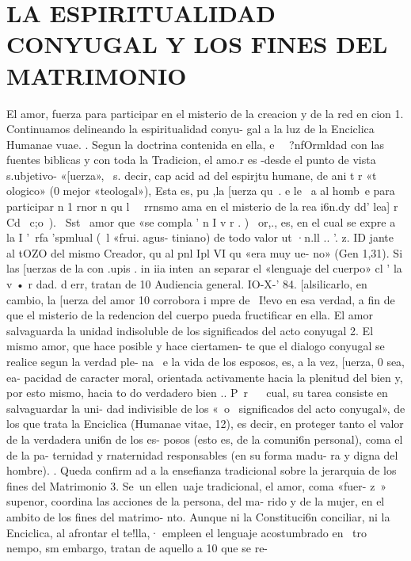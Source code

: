 \documentclass[letterpaper]{report}
\begin{document}
	{\centering
		\section{LA ESPIRITUALIDAD CONYUGAL Y LOS FINES DEL MATRIMONIO}
	}
	El amor, fuerza para participar en el misterio 
de la creacion y de la red en cion 
1. Continuamos delineando la espiritualidad conyu- 
	gal a la luz de la Enciclica Humanae vuae. 	. 
Segun la doctrina contenida en ella, e~ ~?nfOrmldad 
con las fuentes biblicas y con toda la Tradicion, el amo.r 
es -desde el punto de vista s.ubjetivo- «[uerza», ~s. decir, 
cap acid ad del espirjtu humane, de ani t r «t ologico» (0 
mejor «teologal»), Esta es, pu ,la [uerza qu~. e le ~a al 
homb~e para participar n 1 rnor n qu l~~ rrnsmo 
ama en el misterio de la rea i6n.dy dd' lea] r Cd ~c;o~). ~Sst~ 
	amor que «se compla ' n I v r 	. )~ 	or,., 
es, en el cual se expre a la I '~rfa 'spmlual (~l «frui. agus- 
tiniano) de todo valor ut ·n.ll .. '. z. ID jante al tOZO 
del mismo Creador, qu al pnl Ipl VI qu «era muy ue- 
no» (Gen 1,31). 
Si las [uerzas de la con .upis . in iia inten~an separar 
	el «lenguaje del cuerpo» cl ' la v • r dad. 	d err, tratan de 
10 Audiencia general. IO-X-' 84. 
[alsilicarlo, en cambio, la [uerza del amor 10 corrobora 
i mpre de ~I!evo en esa verdad, a fin de que el misterio 
de la redencion del cuerpo pueda fructificar en ella. 
El amor salvaguarda la unidad indisoluble 
de los significados del acto conyugal 
2. El mismo amor, que hace posible y hace ciertamen- 
te que el dialogo conyugal se realice segun la verdad ple- 
na ~e la vida de los esposos, es, a la vez, [uerza, 0 sea, ea- 
pacidad de caracter moral, orientada activamente hacia la 
plenitud del bien y, por esto mismo, hacia to do verdadero 
bien .. P~r ~~ cual, su tarea consiste en salvaguardar la uni- 
dad indivisible de los «~o~ significados del acto conyugal», 
de los que trata la Enciclica (Humanae vitae, 12), es decir, 
en proteger tanto el valor de la verdadera uni6n de los es- 
posos (esto es, de la comuni6n personal), coma el de la pa- 
ternidad y rnaternidad responsables (en su forma madu- 
	ra y digna del hombre). 	. 
Queda confirm ad a la ensefianza tradicional 
sobre la jerarquia de los fines del Matrimonio 
3. Se~un ellen~uaje tradicional, el amor, coma «fuer- 
z~» supenor, coordina las acciones de la persona, del ma- 
rido y de la mujer, en el ambito de los fines del matrimo- 
nto. Aunque ni la Constituci6n conciliar, ni la Enciclica, al 
afrontar el te!lla,· empleen el lenguaje acostumbrado en 
~tro nempo, sm embargo, tratan de aquello a 10 que se re- 
\end{document}
